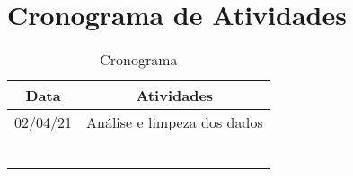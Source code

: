 \documentclass[conference]{IEEEtran}
\begin{document}
\section{Cronograma de Atividades}
\begin{table}[h]
    \centering
    \begin{small}
        \caption{Cronograma} \label{Tabela1}
        \begin{tabular}{cc}
            \hline
            Data                    & Atividades\\
            \hline
            02/04/21                & Análise e limpeza dos dados \\
                                     &  \\
                                    &  \\
                                   &  \\
                                   &  \\
                                     &  \\
                                     &  \\
            \hline
        \end{tabular}
    \end{small}
\end{table}






\nocite{*}

\end{document}
